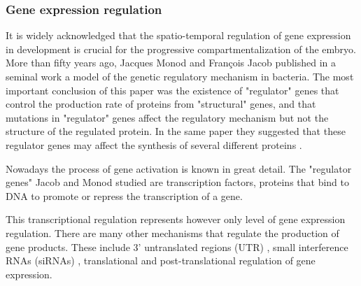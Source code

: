%




\subsubsection{Gene expression regulation}

It is widely acknowledged that the spatio-temporal regulation of gene expression in development is crucial for the progressive compartmentalization of the embryo. 
More than fifty years ago, Jacques Monod and Fran\c cois Jacob \citep{Jacob1961} published in a seminal work a model of the genetic regulatory mechanism in bacteria.
The most important conclusion of this paper was the existence of "regulator" genes that control the production rate of proteins from "structural" genes, and that mutations in "regulator" genes affect the regulatory mechanism but not the structure of the regulated protein. In the same paper they suggested that these regulator genes may affect the synthesis of several different proteins \citep{Jacob1961}.

Nowadays the process of gene activation is known in great detail. The  "regulator genes" Jacob and Monod studied are transcription factors, proteins that bind to DNA to promote or repress the transcription of a gene.

This transcriptional regulation represents however only level of gene expression regulation. There are many other mechanisms that regulate the production of gene products. These include 3' untranslated regions (UTR) \citep{Grzybowska2001}, small interference RNAs (siRNAs) \citep{Filipowicz2005}, translational \citep{Kozak1992,Kapp2004} and post-translational \citep{Mann2003} regulation of gene expression.

